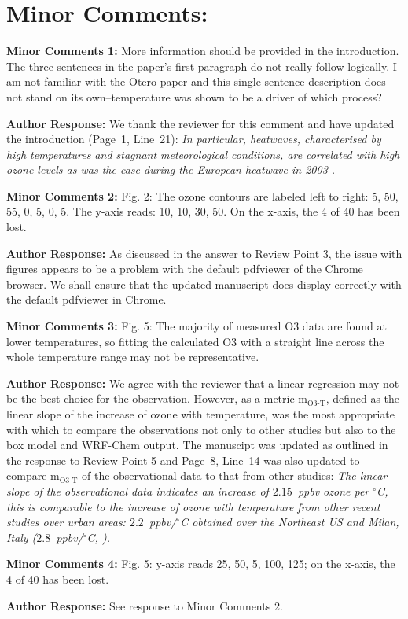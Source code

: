 \documentclass{article}
\DeclareRobustCommand*\degree{\ensuremath{^{\circ}}}
\begin{document}
\section*{Minor Comments:}
\textbf{Minor Comments 1:}  More information should be provided in the introduction. The three sentences in the paper’s first paragraph do not really follow logically. I am not familiar with the Otero paper and this single-sentence description does not stand on its own–temperature was shown to be a driver of which process?

\textbf{Author Response:} We thank the reviewer for this comment and have updated the introduction (Page~1, Line~21):
\textit{
In particular, heatwaves, characterised by high temperatures and stagnant meteorological conditions, are correlated with high ozone levels as was the case during the European heatwave in 2003 \citep{Solberg:2008, Vautard:2005}.
}

\textbf{Minor Comments 2:} Fig. 2: The ozone contours are labeled left to right: 5, 50, 55, 0, 5, 0, 5. The y-axis reads: 10, 10, 30, 50. On the x-axis, the 4 of 40 has been lost.

\textbf{Author Response:} As discussed in the answer to Review Point 3, the issue with figures appears to be a problem with the default pdfviewer of the Chrome browser. We shall ensure that the updated manuscript does display correctly with the default pdfviewer in Chrome.

\textbf{Minor Comments 3:} Fig. 5: The majority of measured O3 data are found at lower temperatures, so fitting the calculated O3 with a straight line across the whole temperature range may not be representative.

\textbf{Author Response:} We agree with the reviewer that a linear regression may not be the best choice for the observation. However, as a metric m$_{\text{O3-T}}$, defined as the linear slope of the increase of ozone with temperature, was the most appropriate with which to compare the observations not only to other studies but also to the box model and WRF-Chem output. The manuscipt was updated as outlined in the response to Review Point 5 and Page~8, Line~14 was also updated to compare m$_{\text{O3-T}}$ of the observational data to that from other studies:
\textit{
The linear slope of the observational data indicates an increase of $2.15$~ppbv ozone per \degree C, this is comparable to the increase of ozone with temperature from other recent studies over urban areas: $2.2$~ppbv/\degree C obtained over the Northeast US \citep{Rasmussen:2013} and Milan, Italy ($2.8$~ppbv/\degree C, \citet{Baertsch-Ritter:2004}).
}

\textbf{Minor Comments 4:} Fig. 5: y-axis reads 25, 50, 5, 100, 125; on the x-axis, the 4 of 40 has been lost.

\textbf{Author Response:} See response to Minor Comments 2.



\end{document}
